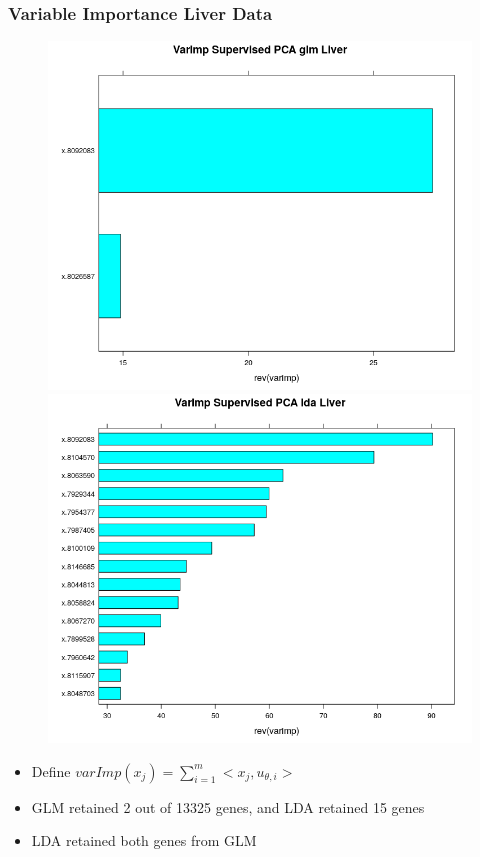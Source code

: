 \documentclass[11pt]{beamer}
\begin{document}
\begin{frame}
\frametitle{Variable Importance Liver Data}
{

\begin{figure}
\includegraphics[scale=0.2]{liverVarImp_glm.png}
\includegraphics[scale=0.2]{liverVarImp_lda.png}
\end{figure}

\begin{itemize}
\item Define $varImp(x_j) = \sum_{i=1}^m <x_j, u_{\theta, i} >$
\item GLM retained 2 out of 13325 genes, and LDA retained 15 genes
\item LDA retained both genes from GLM
\end{itemize}
}
\end{frame}
\end{document}
